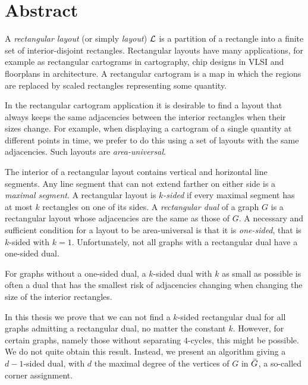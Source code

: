 
\section*{Abstract}
\thispagestyle{plain}

  A  \emph{rectangular layout} (or simply \emph{layout}) $\mathcal{L}$ is a partition of a rectangle into a finite set of interior-disjoint rectangles. Rectangular layouts have many applications, for example as rectangular cartograms in cartography, chip designs in VLSI and floorplans in architecture. A rectangular cartogram is a map in which the regions are replaced by scaled rectangles representing some quantity.

  In the rectangular cartogram application it is desirable to find a layout that always keeps the same adjacencies between the interior rectangles when their sizes change. For example, when displaying a cartogram of a single quantity at different points in time, we prefer to do this using a set of layouts with the same adjacencies. Such layouts are \emph{area-universal}.

  The interior of a rectangular layout contains vertical and horizontal line segments.
  Any line segment that can not extend farther on either side is a \emph{maximal segment}.
  A rectangular layout is \emph{$k$-sided} if every maximal segment has at most $k$ rectangles on one of its sides.
  A \emph{rectangular dual} of a graph $G$ is a rectangular layout whose adjacencies are the same as those of $G$.
  A necessary and sufficient condition for a layout to be area-universal is that it is \emph{one-sided}, that is $k$-sided with $k=1$.
  Unfortunately, not all graphs with a rectangular dual have a one-sided dual.

  For graphs without a one-sided dual, a $k$-sided dual with $k$ as small as possible is often a dual that has the smallest risk of adjacencies changing when changing the size of the interior rectangles.

  In this thesis we prove that we can not find a $k$-sided rectangular dual for all graphs admitting a rectangular dual, no matter the constant $k$.
  However, for certain graphs, namely those without separating $4$-cycles, this might be possible.
  We do not quite obtain this result. Instead, we present an algorithm giving a $d-1$-sided dual, with $d$ the maximal degree of the vertices of $G$ in $\bar{G}$, a so-called corner assignment.
